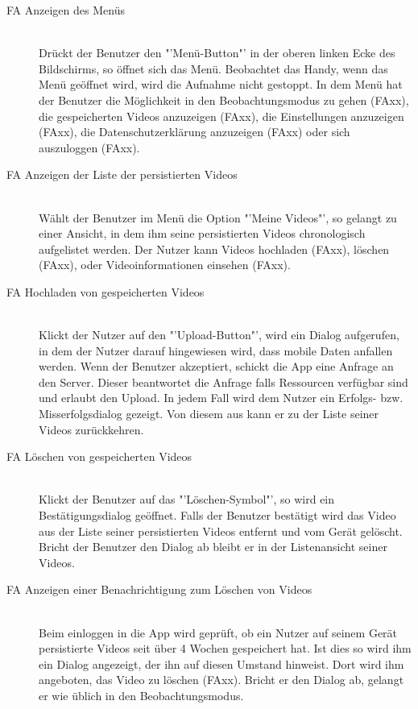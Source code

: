\begin{description}
\item[FA Anzeigen des Menüs] \hfill \\
Drückt der Benutzer den "'Menü-Button"' in der oberen linken Ecke des Bildschirms, so öffnet sich das Menü. Beobachtet das Handy, wenn das Menü geöffnet wird, wird die Aufnahme nicht gestoppt. In dem Menü hat der Benutzer die Möglichkeit in den Beobachtungsmodus zu gehen (FAxx), die gespeicherten Videos anzuzeigen (FAxx), die Einstellungen anzuzeigen (FAxx), die Datenschutzerklärung anzuzeigen (FAxx) oder sich auszuloggen (FAxx).

\item[FA Anzeigen der Liste der persistierten Videos] \hfill \\
Wählt der Benutzer im Menü die Option "'Meine Videos"', so gelangt zu einer Ansicht, in dem ihm seine persistierten Videos chronologisch aufgelistet werden. Der Nutzer kann Videos hochladen (FAxx), löschen (FAxx), oder Videoinformationen einsehen (FAxx).

\item[FA Hochladen von gespeicherten Videos] \hfill \\
Klickt der Nutzer auf den "'Upload-Button"', wird ein Dialog aufgerufen, in dem der Nutzer darauf hingewiesen wird, dass mobile Daten anfallen werden. Wenn der Benutzer akzeptiert, schickt die App eine Anfrage an den Server. Dieser beantwortet die Anfrage falls Ressourcen verfügbar sind und erlaubt den Upload. In jedem Fall wird dem Nutzer ein Erfolgs- bzw. Misserfolgsdialog gezeigt. Von diesem aus kann er zu der Liste seiner Videos zurückkehren.

\item[FA Löschen von gespeicherten Videos] \hfill \\
Klickt der Benutzer auf das "'Löschen-Symbol"', so wird ein Bestätigungsdialog geöffnet. Falls der Benutzer bestätigt wird das Video aus der Liste seiner persistierten Videos entfernt und vom Gerät gelöscht. Bricht der Benutzer den Dialog ab bleibt er in der Listenansicht seiner Videos.

\item[FA Anzeigen einer Benachrichtigung zum Löschen von Videos] \hfill \\
Beim einloggen in die App wird geprüft, ob ein Nutzer auf seinem Gerät persistierte Videos seit über 4 Wochen gespeichert hat. Ist dies so wird ihm ein Dialog angezeigt, der ihn auf diesen Umstand hinweist. Dort wird ihm angeboten, das Video zu löschen (FAxx). Bricht er den Dialog ab, gelangt er wie üblich in den Beobachtungsmodus.


\end{description}
